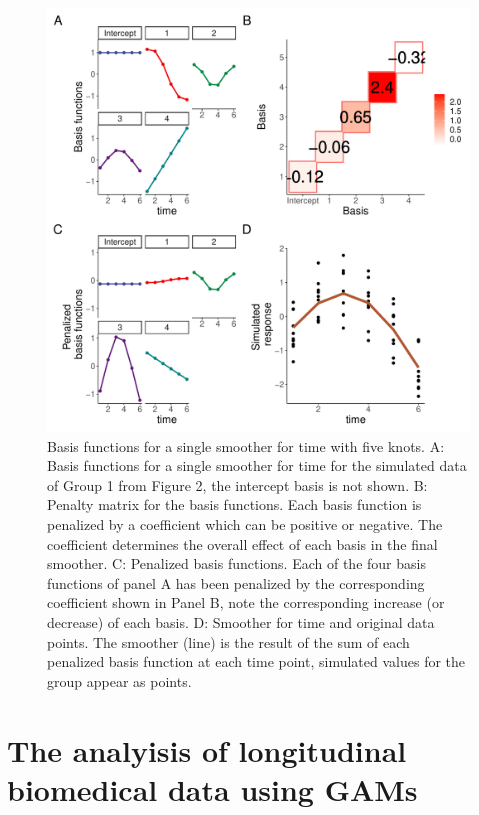 \documentclass[
]{article}
\begin{document}
\begin{figure}[!h]

{\centering \includegraphics[width=0.75\linewidth,]{Full_document_files/figure-latex/basis-plot-1} 

}

\caption{Basis functions for a single smoother for time with five knots. A: Basis functions for a single smoother for time for the simulated data of Group 1 from Figure 2, the intercept basis is not shown. B: Penalty matrix for the basis functions. Each basis function is penalized by a coefficient which can be positive or negative. The coefficient determines the overall effect of each basis in the final smoother. C: Penalized basis functions. Each of the four basis functions of panel A has been penalized by the corresponding coefficient shown in Panel B, note the corresponding increase (or decrease) of each basis. D: Smoother for time and original data points. The smoother (line) is the result of the sum of each penalized basis function at each time point, simulated values for the group appear as points.}\label{fig:basis-plot}
\end{figure}

\FloatBarrier

\newpage

\hypertarget{the-analyisis-of-longitudinal-biomedical-data-using-gams}{%
\section{The analyisis of longitudinal biomedical data using GAMs}\label{the-analyisis-of-longitudinal-biomedical-data-using-gams}}
\end{document}

